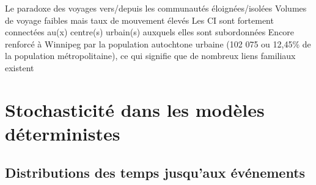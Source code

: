 \documentclass[aspectratio=169]{beamer}\usepackage[]{graphicx}\usepackage[]{xcolor}
\begin{document}

\begin{frame}{Le paradoxe des voyages vers/depuis les communautés éloignées/isolées}
Volumes de voyage faibles mais taux de mouvement élevés
\vfill
Les CI sont fortement connectées au(x) centre(s) urbain(s) auxquels elles sont subordonnées
\vfill
Encore renforcé à Winnipeg par la population autochtone urbaine (102 075 ou 12,45\% de la population métropolitaine), ce qui signifie que de nombreux liens familiaux existent
\end{frame}

% 
% 



\section{Stochasticité dans les modèles déterministes}


\subsection{Distributions des temps jusqu'aux événements}
\end{document}
